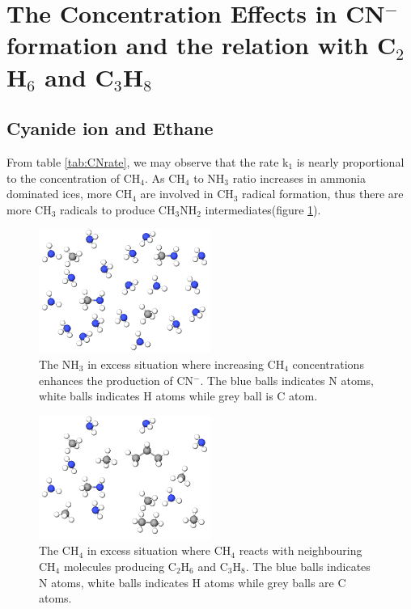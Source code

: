 \section{The Concentration Effects in CN$^-$formation and the relation with C$_2$H$_6$ and C$_3$H$_8$}



\subsection{Cyanide ion and Ethane}

From table \ref{tab:CNrate}, we may observe that the rate k$_1$ is nearly proportional to the concentration of CH$_4$.  As CH$_4$ to NH$_3$ ratio increases in ammonia dominated ices, more CH$_4$ are involved in CH$_3$ radical formation, thus there are more CH$_3$ radicals to produce CH$_3$NH$_2$ intermediates(figure \ref{fig:NH3_dominated}).\\

\begin{figure}
\centering
\includegraphics[width=0.5\textwidth]{figures/ammonia_dominating.png}
\caption{The NH$_3$ in excess situation where increasing CH$_4$ concentrations enhances the production of CN$^-$. The blue balls indicates N atoms, white balls indicates H atoms while grey ball is C atom.}
\label{fig:NH3_dominated}
\end{figure}


\begin{figure}
\centering
\includegraphics[width=0.5\textwidth]{figures/methane_dominating.png}
\caption{The CH$_4$ in excess situation where CH$_4$ reacts with neighbouring CH$_4$ molecules producing C$_2$H$_6$ and C$_3$H$_8$. The blue balls indicates N atoms, white balls indicates H atoms while grey balls are C atoms.}
\label{fig:CH4_dominated}
\end{figure}


